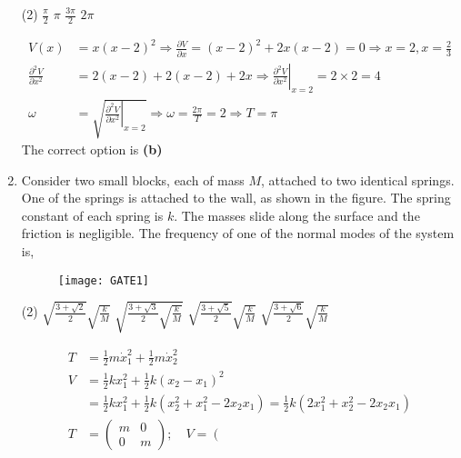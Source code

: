 \begin{enumerate}
{	}
\begin{tasks}(2)
	\task[\textbf{A.}] $\frac{\pi}{2}$
	\task[\textbf{B.}]$\pi$
	\task[\textbf{C.}]$\frac{3 \pi}{2}$
	\task[\textbf{D.}]$2 \pi$
\end{tasks}
\begin{answer}
\begin{align*}
V(x)&=x(x-2)^{2} \Rightarrow \frac{\partial V}{\partial x}=(x-2)^{2}+2 x(x-2)=0 \Rightarrow x=2, x=\frac{2}{3}\\
\frac{\partial^{2} V}{\partial x^{2}}&=2(x-2)+2(x-2)+\left.2 x \Rightarrow \frac{\partial^{2} V}{\partial x^{2}}\right|_{x=2}=2 \times 2=4\\
\omega&=\sqrt{\left.\frac{\partial^{2} V}{\partial x^{2}}\right|_{x=2}} \Rightarrow \omega=\frac{2 \pi}{T}=2 \Rightarrow T=\pi
\end{align*}
The correct option is \textbf{(b)}	
\end{answer}
	\item Consider two small blocks, each of mass $M$, attached to two identical springs. One of the springs is attached to the wall, as shown in the figure. The spring constant of each spring is $k$. The masses slide along the surface and the friction is negligible. The frequency of one of the normal modes of the system is,
	{}
	\begin{figure}[H]
		\centering
		\texttt{[image: GATE1]}
	\end{figure}
\begin{tasks}(2)
	\task[\textbf{A.}] $\sqrt{\frac{3+\sqrt{2}}{2}} \sqrt{\frac{k}{M}}$
	\task[\textbf{B.}]$\sqrt{\frac{3+\sqrt{3}}{2} \sqrt{\frac{k}{M}}}$
	\task[\textbf{C.}]$\sqrt{\frac{3+\sqrt{5}}{2}} \sqrt{\frac{k}{M}}$
	\task[\textbf{D.}]$\sqrt{\frac{3+\sqrt{6}}{2}} \sqrt{\frac{k}{M}}$
\end{tasks}
\begin{answer}
	\begin{align*}
		T&=\frac{1}{2} m \dot{x}_{1}^{2}+\frac{1}{2} m \dot{x}_{2}^{2}\\
		V&=\frac{1}{2} k x_{1}^{2}+\frac{1}{2} k\left(x_{2}-x_{1}\right)^{2}\\
		&=\frac{1}{2} k x_{1}^{2}+\frac{1}{2} k\left(x_{2}^{2}+x_{1}^{2}-2 x_{2} x_{1}\right)=\frac{1}{2} k\left(2 x_{1}^{2}+x_{2}^{2}-2 x_{2} x_{1}\right)\\
		T&=\left(\begin{array}{cc}
		m & 0 \\
		0 & m
		\end{array}\right) ; \quad V=\left(\begin{array}{cc}

\end{array}
\end{align*}
\end{answer}
\end{enumerate}
